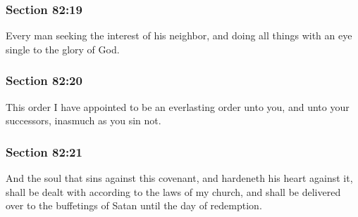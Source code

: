 	\subsubsection{Section 82:19} %
		\label{DC82-19}

		Every man seeking the interest of his neighbor, and doing all things with an eye single to the glory of God.


	\subsubsection{Section 82:20} %
		\label{DC82-20}

		This order I have appointed to be an everlasting order unto you, and unto your successors, inasmuch as you sin not.


	\subsubsection{Section 82:21} %
		\label{DC82-21}

		And the soul that sins against this covenant, and hardeneth his heart against it, shall be dealt with according to the laws of my church, and shall be delivered over to the buffetings of Satan until the day of redemption.


